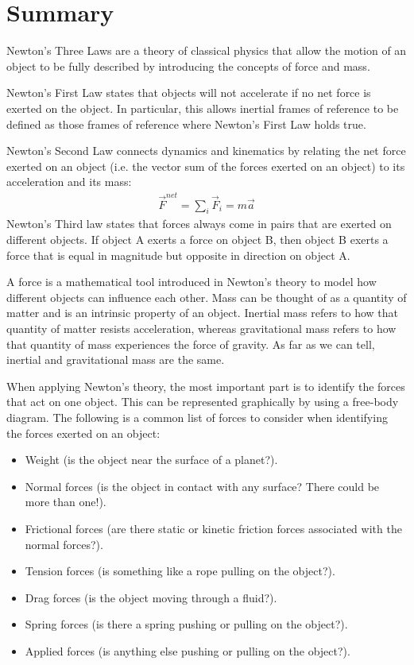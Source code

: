 \section{Summary}
\vspace{1cm}
\begin{chapterSummary}
Newton's Three Laws are a theory of classical physics that allow the motion of an object to be fully described by introducing the concepts of force and mass.
 
Newton's First Law states that objects will not accelerate if no net force is exerted on the object. In particular, this allows inertial frames of reference to be defined as those frames of reference where Newton's First Law holds true.
 
Newton's Second Law connects dynamics and kinematics by relating the net force exerted on an object (i.e. the vector sum of the forces exerted on an object) to its acceleration and its mass:
\begin{align*}
\vec F^{net} = \sum_i \vec F_i = m\vec a
\end{align*}
Newton's Third law states that forces always come in pairs that are exerted on different objects. If object A exerts a force on object B, then object B exerts a force that is equal in magnitude but opposite in direction on object A.
 
A force is a mathematical tool introduced in Newton's theory to model how different objects can influence each other. Mass can be thought of as a quantity of matter and is an intrinsic property of an object. Inertial mass refers to how that quantity of matter resists acceleration, whereas gravitational mass refers to how that quantity of mass experiences the force of gravity. As far as we can tell, inertial and gravitational mass are the same.

When applying Newton's theory, the most important part is to identify the forces that act on one object. This can be represented graphically by using a free-body diagram. The following is a common list of forces to consider when identifying the forces exerted on an object:
\begin{itemize}
\item Weight (is the object near the surface of a planet?).
\item Normal forces (is the object in contact with any surface? There could be more than one!).
\item Frictional forces (are there static or kinetic friction forces associated with the normal forces?).
\item Tension forces (is something like a rope pulling on the object?).
\item Drag forces (is the object moving through a fluid?).
\item Spring forces (is there a spring pushing or pulling on the object?).
\item Applied forces (is anything else pushing or pulling on the object?).
\end{itemize}


\end{chapterSummary}

